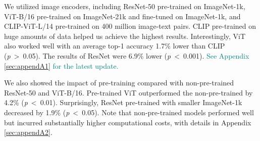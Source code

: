 We utilized image encoders, including ResNet-50 pre-trained on ImageNet-1k, ViT-B/16 pre-trained on ImageNet-21k and fine-tuned on ImageNet-1k, and CLIP-ViT-L/14 pre-trained on 400 million image-text pairs. 
CLIP pre-trained on huge amounts of data helped us achieve the highest results.
Interestingly, ViT also worked well with an average top-1 accuracy 1.7\% lower than CLIP (\textit{p}\ \textgreater\ 0.05).
The results of ResNet were 6.9\% lower (\textit{p}\ \textless\ 0.001).
\textcolor{teal}{See Appendix \ref{sec:appendA1} for the latest update.}

We also showed the impact of pre-training compared with non-pre-trained ResNet-50 and ViT-B/16. 
Pre-trained ViT outperformed the non-pre-trained by 4.2\% (\textit{p}\ \textless\ 0.01). 
Surprisingly, ResNet pre-trained with smaller ImageNet-1k decreased by 1.9\% (\textit{p}\ \textless\ 0.05).
Note that non-pre-trained models performed well but incurred substantially higher computational costs, with details in Appendix \ref{sec:appendA2}.

